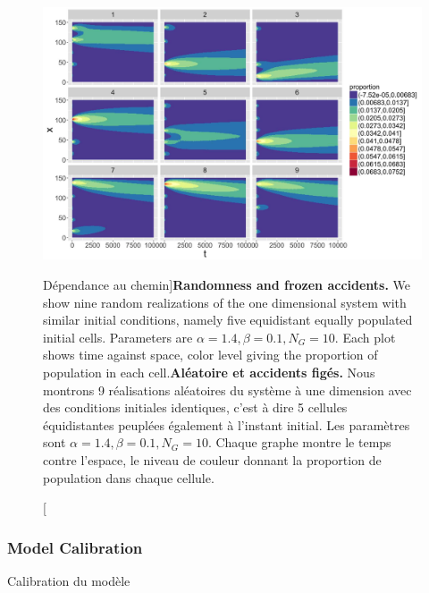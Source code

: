 \begin{figure}[h!]
\includegraphics[width=\linewidth]{Figures/Final/5-2-2-fig-density-fig4}
\caption[Randomness and frozen accidents][Dépendance au chemin]{\textbf{Randomness and frozen accidents.} We show nine random realizations of the one dimensional system with similar initial conditions, namely five equidistant equally populated initial cells. Parameters are $\alpha = 1.4,\beta =0.1,N_G=10$. Each plot shows time against space, color level giving the proportion of population in each cell.\label{fig:density:fig4}}{\textbf{Aléatoire et accidents figés.} Nous montrons 9 réalisations aléatoires du système à une dimension avec des conditions initiales identiques, c'est à dire 5 cellules équidistantes peuplées également à l'instant initial. Les paramètres sont $\alpha = 1.4,\beta =0.1,N_G=10$. Chaque graphe montre le temps contre l'espace, le niveau de couleur donnant la proportion de population dans chaque cellule.\label{fig:density:fig4}}
\end{figure}





\subsubsection{Model Calibration}{Calibration du modèle}


